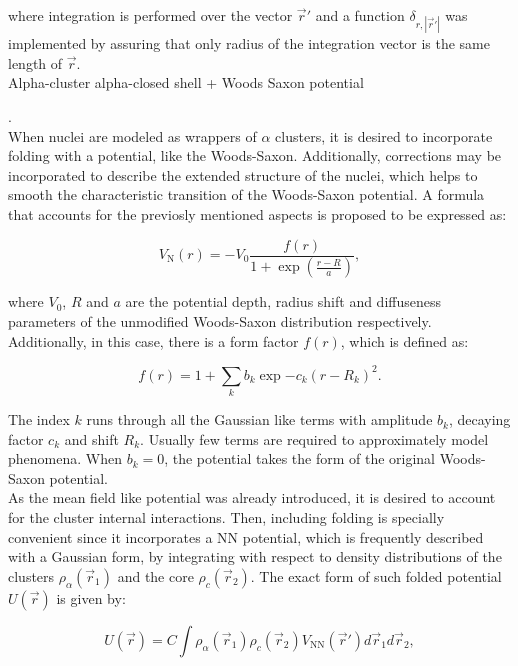 \documentclass[openany]{book}
\begin{document}
where integration is performed over the vector $\vec r'$ and a function $\delta_{r, |\vec r'|}$ was implemented by assuring that only radius of the integration vector is the same length of $\vec r$. \\

Alpha-cluster alpha-closed shell + Woods Saxon potential  

\cite{bai_ren_2018}. \\

When nuclei are modeled as wrappers of $\alpha$ clusters, it is desired to incorporate folding with a potential, like the Woods-Saxon. Additionally, corrections may be incorporated to describe the extended structure of the nuclei, which helps to smooth the characteristic transition of the Woods-Saxon potential. A formula that accounts for the previosly mentioned aspects is proposed to be expressed as: 

\begin{equation}\label{eq:micro_doubleFolding_potential_N}
	V_{\mathrm{N}}(r) = - V_0 \frac{f(r)}{1 + \exp {\left( \frac{r - R}{a}\right)}},
\end{equation}

where $V_0$, $R$ and $a$ are the potential depth,  radius shift and diffuseness parameters of the unmodified Woods-Saxon distribution respectively. Additionally, in this case, there is a form factor $f(r)$, which is defined as: 

 \begin{equation}\label{eq:micro_doubleFolding_potential_formFactor}
	 f(r) =  1+ \sum_k{ b_k \exp  {-c_k(r - R_k)^2}}.
 \end{equation} 

The index $k$ runs through all the Gaussian like terms with amplitude $b_k$, decaying factor $c_k$ and shift $R_k$. Usually few terms are required to approximately model phenomena. When $b_k = 0$, the potential takes the form of the original Woods-Saxon potential.  \\

As the mean field like potential was already introduced, it is desired to account for the cluster internal interactions. Then, including folding is specially convenient since it incorporates a $\mathrm{NN}$ potential, which is frequently described with a Gaussian form, by integrating with respect to density distributions of the clusters $\rho_\alpha(\vec r_1)$ and the core  $\rho_c(\vec r_2)$. The exact form of such folded potential $U(\vec r)$ is given by:

\begin{equation}\label{eq:micro_doubleFolding_potential}
	U(\vec r) = C \int { \rho_\alpha(\vec r_1) \rho_c (\vec r_2) V_{\mathrm{NN}} (\vec r') d\vec r_1 d\vec r_2},
\end{equation}
\end{document}
